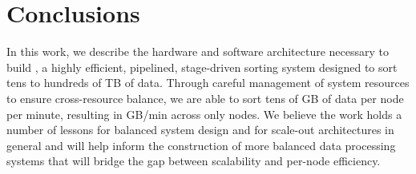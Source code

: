 \section{Conclusions}
\label{tritonsort:sec:conclusions}

In this work, we describe the hardware and software architecture necessary to
build \tritonsort, a highly efficient, pipelined, stage-driven sorting system
designed to sort tens to hundreds of TB of data.  Through careful management of
system resources to ensure cross-resource balance, we are able to sort tens of
GB of data per node per minute, resulting in \tsrate GB/min across only
\tsnodes nodes.  We believe the work holds a number of lessons for balanced
system design and for scale-out architectures in general and will help inform
the construction of more balanced data processing systems that will bridge the
gap between scalability and per-node efficiency.

